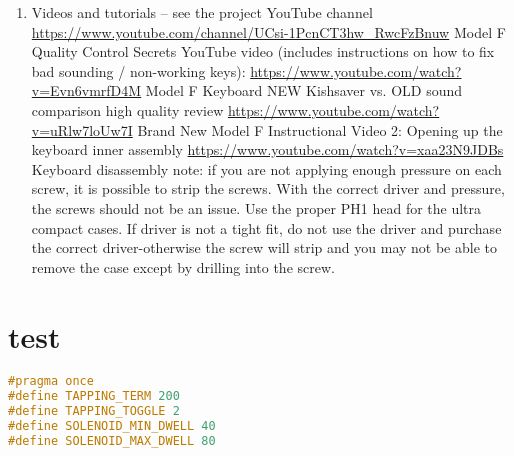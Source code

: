 \documentclass[a5paper, twoside]{memoir}
\begin{document}
\begin{enumerate}
\begin{itemize}
\begin{itemize}
\end{itemize}
\end{itemize}
\item     Videos and tutorials – see the project YouTube channel \url{https://www.youtube.com/channel/UCsi-1PcnCT3hw_RwcFzBnuw}
        Model F Quality Control Secrets YouTube video (includes instructions on how to fix bad sounding / non-working keys):  \url{https://www.youtube.com/watch?v=Evn6vmrfD4M}
        Model F Keyboard NEW Kishsaver vs. OLD sound comparison high quality review \url{https://www.youtube.com/watch?v=uRlw7loUw7I}
        Brand New Model F Instructional Video 2: Opening up the keyboard inner assembly \url{https://www.youtube.com/watch?v=xaa23N9JDBs}
        Keyboard disassembly note:  if you are not applying enough pressure on each screw, it is possible to strip the screws. With the correct driver and pressure, the screws should not be an issue.  Use the proper PH1 head for the ultra compact cases. If driver is not a tight fit, do not use the driver and purchase the correct driver-otherwise the screw will strip and you may not be able to remove the case except by drilling into the screw.
        
\end{enumerate}        
        
\chapter{test}


\begin{lstlisting}[language=C++, caption={C++ file}]
#pragma once
#define TAPPING_TERM 200
#define TAPPING_TOGGLE 2
#define SOLENOID_MIN_DWELL 40
#define SOLENOID_MAX_DWELL 80
\end{lstlisting}
\end{document}
